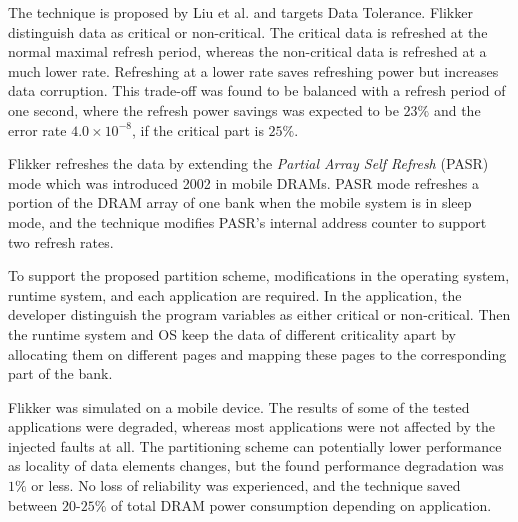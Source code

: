 The technique is proposed by Liu et al. \cite{flikker} and targets Data Tolerance. Flikker distinguish data as critical or non-critical. The critical data is refreshed at the normal maximal refresh period, whereas the non-critical data is refreshed at a much lower rate. Refreshing at a lower rate saves refreshing power but increases data corruption. This trade-off was found to be balanced with a refresh period of one second, where the refresh power savings was expected to be $23\%$ and the error rate $4.0 \times 10^{-8}$, if the critical part is $25\%$.

Flikker refreshes the data by extending the \textit{Partial Array Self Refresh} (PASR) mode which was introduced 2002 in mobile DRAMs. PASR mode refreshes a portion of the DRAM array of one bank when the mobile system is in sleep mode, and the technique modifies PASR's internal address counter to support two refresh rates.

To support the proposed partition scheme, modifications in the operating system, runtime system, and each application are required. In the application, the developer distinguish the program variables as either critical or non-critical. Then the runtime system and OS keep the data of different criticality apart by allocating them on different pages and mapping these pages to the corresponding part of the bank.


Flikker was simulated on a mobile device. The results of some of the tested applications were degraded, whereas most applications were not affected by the injected faults at all. The partitioning scheme can potentially lower performance as locality of data elements changes, but the found performance degradation was $1\%$ or less. No loss of reliability was experienced, and the technique saved between $20$-$25\%$ of total DRAM power consumption depending on application.